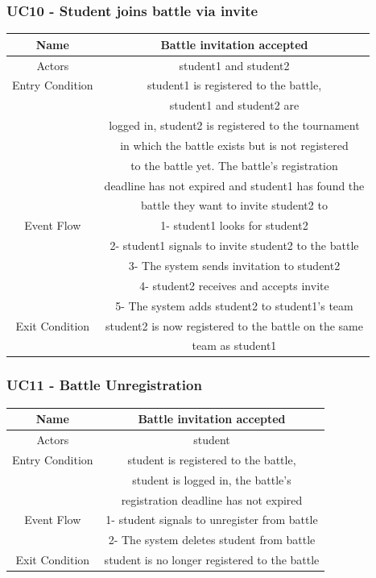 \documentclass{article}
\begin{document}
\subsubsection*{UC10 - Student joins battle via invite}

\begin{tabular*}{\linewidth}{@{\extracolsep{\fill}} cc }
    \hline
    Name & Battle invitation accepted \\ 
    \hline
    Actors & student1 and student2\\ 
    \hline
    Entry Condition & student1 is registered to the battle,\\
                    & student1 and student2 are \\
                    & logged in, student2 is registered to the tournament\\
                    & in which the battle exists but is not registered\\
                    & to the battle yet. The battle's registration\\
                    & deadline has not expired and student1 has found the\\
                    & battle they want to invite student2 to\\
    \hline
    Event Flow & 1- student1 looks for student2\\
               & 2- student1 signals to invite student2 to the battle\\
               & 3- The system sends invitation to student2\\ 
               & 4- student2 receives and accepts invite\\
               & 5- The system adds student2 to student1's team\\
    \hline
    Exit Condition & student2 is now registered to the battle on the same\\
                   & team as student1\\
    \hline
\end{tabular*}

\subsubsection*{UC11 - Battle Unregistration}

\begin{tabular*}{\linewidth}{@{\extracolsep{\fill}} cc }
    \hline
    Name & Battle invitation accepted \\ 
    \hline
    Actors & student\\
    \hline
    Entry Condition & student is registered to the battle,\\
                    & student is logged in, the battle's \\
                    & registration deadline has not expired\\
    \hline
    Event Flow & 1- student signals to unregister from battle\\
               & 2- The system deletes student from battle\\
    \hline
    Exit Condition & student is no longer registered to the battle\\
    \hline
\end{tabular*}
\end{document}
